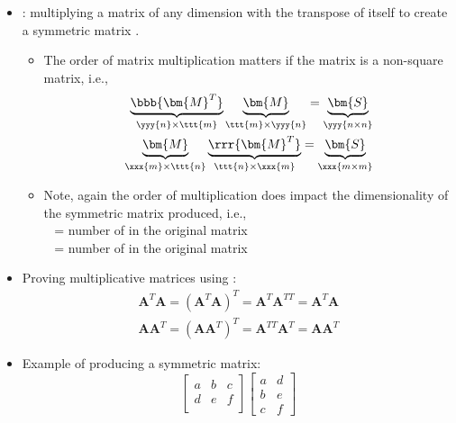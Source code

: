 \begin{itemize}
\begin{itemize}
    \item {}: multiplying a matrix  of any dimension with the transpose of itself to create a symmetric matrix .
      \begin{itemize}
        \item The order of matrix multiplication matters if the matrix is a non-square matrix, i.e.,
        \begin{align*}
          \underbrace{\bbb{\bm{M}^T}}_{\yyy{n} \times \ttt{m}} 
          \underbrace{\bm{M}}_{\ttt{m} \times \yyy{n}} = \underbrace{\bm{S}}_{\yyy{n \times n}}\\
          \underbrace{\bm{M}}_{\xxx{m} \times \ttt{n}} 
          \underbrace{\rrr{\bm{M}^T}}_{\ttt{n} \times \xxx{m}} = \underbrace{\bm{S}}_{\xxx{m \times m}}\\
        \end{align*}\vspace*{-42pt}
        \item Note, again the order of multiplication does impact the dimensionality of the symmetric matrix produced, i.e.,\\
         \to~ = number of  in the original matrix
        \\
         \to~ = number of  in the original matrix
      \end{itemize}
      \item Proving multiplicative matrices using \hyperref[Order of Operations]{}:
      \begin{align*}
        \bm{A}^T \bm{A} = (\bm{A}^T \bm{A})^T = \bm{A}^T \bm{A}^{TT} = \bm{A}^T\bm{A}\\ %
        \bm{A}\bm{A}^T = (\bm{A}\bm{A}^T)^T = \bm{A}^{TT}\bm{A}^T = \bm{A}\bm{A}^T %
      \end{align*}
      \item Example of producing a symmetric matrix:
      \[%
      \begin{bmatrix}
      a & b & c \\
      d & e & f \\
      \end{bmatrix}
      \begin{bmatrix}
      a & d \\
      b & e \\
      c & f   

\end{bmatrix}\]
\end{itemize}
\end{itemize}
